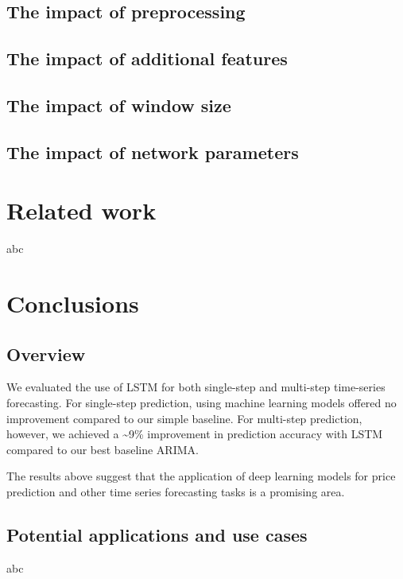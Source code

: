 \documentclass{article}
\begin{document}
\subsection{The impact of preprocessing}

\subsection{The impact of additional features}

\subsection{The impact of window size}

\subsection{The impact of network parameters}


\section{Related work}
\label{sec:related}

abc


\section{Conclusions}
\label{sec:conclusion}

\subsection{Overview}

We evaluated the use of LSTM for both single-step and multi-step time-series forecasting. For single-step prediction, using machine learning models offered no improvement compared to our simple baseline. For multi-step prediction, however, we achieved a \textasciitilde9\% improvement in prediction accuracy with LSTM compared to our best baseline ARIMA.

The results above suggest that the application of deep learning models for price prediction and other time series forecasting tasks is a promising area.

\subsection{Potential applications and use cases}

abc
\end{document}
